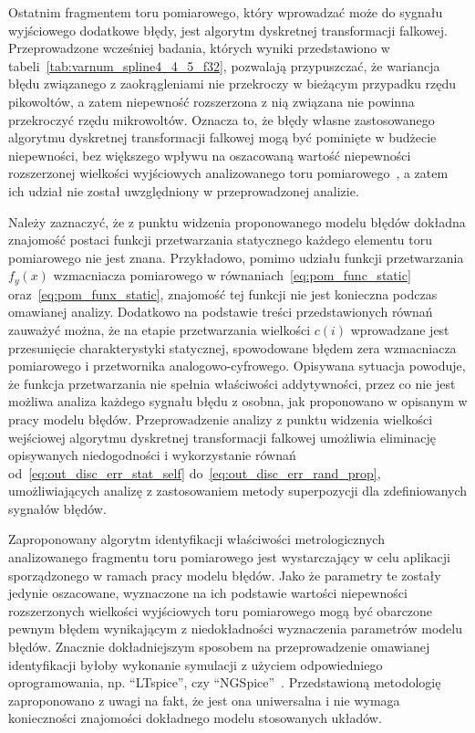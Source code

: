 Ostatnim fragmentem toru pomiarowego, który wprowadzać może do sygnału wyjściowego dodatkowe błędy, jest algorytm dyskretnej transformacji falkowej. Przeprowadzone wcześniej badania, których wyniki przedstawiono w tabeli~\ref{tab:varnum_spline4_4_5_f32}, pozwalają przypuszczać, że wariancja błędu związanego z zaokrągleniami nie przekroczy w bieżącym przypadku rzędu pikowoltów, a zatem niepewność rozszerzona z nią związana nie powinna przekroczyć rzędu mikrowoltów. Oznacza to, że błędy własne zastosowanego algorytmu dyskretnej transformacji falkowej mogą być pominięte w budżecie niepewności, bez większego wpływu na oszacowaną wartość niepewności rozszerzonej wielkości wyjściowych analizowanego toru pomiarowego~\cite{jcgm_guide}, a zatem ich udział nie został uwzględniony w przeprowadzonej analizie.

Należy zaznaczyć, że z punktu widzenia proponowanego modelu błędów dokładna znajomość postaci funkcji przetwarzania statycznego każdego elementu toru pomiarowego nie jest znana. Przykładowo, pomimo udziału funkcji przetwarzania $f_{y}(x)$ wzmacniacza pomiarowego w równaniach~\eqref{eq:pom_func_static} oraz~\eqref{eq:pom_funx_static}, znajomość tej funkcji nie jest konieczna podczas omawianej analizy. Dodatkowo na podstawie treści przedstawionych równań zauważyć można, że na etapie przetwarzania wielkości $c(i)$ wprowadzane jest przesunięcie charakterystyki statycznej, spowodowane błędem zera wzmacniacza pomiarowego i przetwornika analogowo-cyfrowego. Opisywana sytuacja powoduje, że funkcja przetwarzania nie spełnia właściwości addytywności, przez co nie jest możliwa analiza każdego sygnału błędu z osobna, jak proponowano w opisanym w pracy modelu błędów. Przeprowadzenie analizy z punktu widzenia wielkości wejściowej algorytmu dyskretnej transformacji falkowej umożliwia eliminację opisywanych niedogodności i wykorzystanie równań od~\eqref{eq:out_disc_err_stat_self} do~\eqref{eq:out_disc_err_rand_prop}, umożliwiających analizę z zastosowaniem metody superpozycji dla zdefiniowanych sygnałów błędów.

Zaproponowany algorytm identyfikacji właściwości metrologicznych analizowanego fragmentu toru pomiarowego jest wystarczający w celu aplikacji sporządzonego w ramach pracy modelu błędów. Jako że parametry te zostały jedynie oszacowane, wyznaczone na ich podstawie wartości niepewności rozszerzonych wielkości wyjściowych toru pomiarowego mogą być obarczone pewnym błędem wynikającym z niedokładności wyznaczenia parametrów modelu błędów. Znacznie dokładniejszym sposobem na przeprowadzenie omawianej identyfikacji byłoby wykonanie symulacji z użyciem odpowiedniego oprogramowania, np. \enquote{LTspice}, czy \enquote{NGSpice}~\cite{mikkelsen_ltspice, nenzi_ngspice}. Przedstawioną metodologię zaproponowano z uwagi na fakt, że jest ona uniwersalna i nie wymaga konieczności znajomości dokładnego modelu stosowanych układów.

